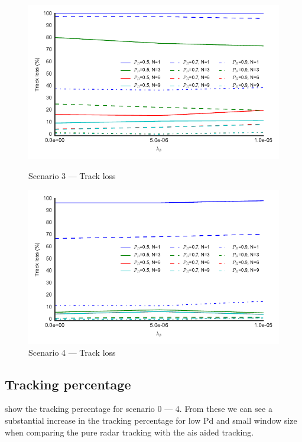 \begin{figure}
\centering
\includegraphics{Figures/plots/Scenario3_Tracking-TrackLoss.pdf}
\caption{Scenario 3 --- Track loss}\label{fig:scenario3_track_loss}
\includegraphics{Figures/plots/Scenario4_Tracking-TrackLoss.pdf}
\caption{Scenario 4 --- Track loss}\label{fig:scenario4_track_loss}
\end{figure}
\clearpage

\subsection{Tracking percentage}
 show the tracking percentage for scenario 0 --- 4. From these we can see a substantial increase in the tracking percentage for low \gls{Pd} and small window size when comparing the pure radar tracking with the \gls{ais} aided tracking. 

